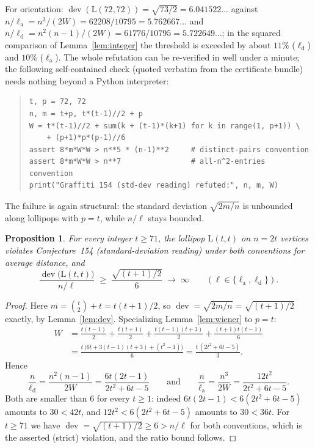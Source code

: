 \documentclass[11pt]{article}
\newtheorem{proposition}[theorem]{Proposition}
\theoremstyle{remark}
\newcommand{\dev}{\operatorname{dev}}
\newcommand{\la}{\ell_{\mathrm{a}}}
\newcommand{\ld}{\ell_{\mathrm{d}}}
\newcommand{\Lol}{\mathrm{L}}
\begin{document}
For orientation: $\dev(\Lol(72,72)) = \sqrt{73/2} = 6.041522\ldots$ against
$n/\la = n^3/(2W) = 62208/10795 = 5.762667\ldots$ and
$n/\ld = n^2(n-1)/(2W) = 61776/10795 = 5.722649\ldots$; in the squared
comparison of Lemma~\ref{lem:integer} the threshold is exceeded by about
$11\%$ ($\ld$) and $10\%$ ($\la$). The whole refutation can be re-verified
in well under a minute; the following self-contained check (quoted verbatim
from the certificate bundle) needs nothing beyond a Python interpreter:

\begin{quote}
\begin{verbatim}
t, p = 72, 72
n, m = t+p, t*(t-1)//2 + p
W = t*(t-1)//2 + sum(k + (t-1)*(k+1) for k in range(1, p+1)) \
    + (p+1)*p*(p-1)//6
assert 8*m*W*W > n**5 * (n-1)**2     # distinct-pairs convention
assert 8*m*W*W > n**7                # all-n^2-entries convention
print("Graffiti 154 (std-dev reading) refuted:", n, m, W)
\end{verbatim}
\end{quote}

The failure is again structural: the standard deviation $\sqrt{2m/n}$ is
unbounded along lollipops with $p = t$, while $n/\ell$ stays bounded.

\begin{proposition}\label{prop:154asymp}
For every integer $t \ge 71$, the lollipop $\Lol(t,t)$ on $n = 2t$ vertices
violates Conjecture~154 (standard-deviation reading) under both conventions
for average distance, and
\[
\frac{\dev\bigl(\Lol(t,t)\bigr)}{\,n/\ell\,} \;\ge\;
\frac{\sqrt{(t+1)/2}}{6} \;\longrightarrow\; \infty
\qquad (\ell \in \{\la, \ld\}).
\]
\end{proposition}

\begin{proof}
Here $m = \binom{t}{2} + t = t(t+1)/2$, so $\dev = \sqrt{2m/n} =
\sqrt{(t+1)/2}$ exactly, by Lemma~\ref{lem:dev}. Specializing
Lemma~\ref{lem:wiener} to $p = t$:
\begin{align*}
W &= \frac{t(t-1)}{2} + \frac{t(t+1)}{2} + \frac{t(t-1)(t+3)}{2}
+ \frac{(t+1)t(t-1)}{6}\\
&= \frac{t\,\bigl(6t + 3(t-1)(t+3) + (t^2-1)\bigr)}{6}
= \frac{t\,(2t^2 + 6t - 5)}{3}.
\end{align*}
Hence
\[
\frac{n}{\ld} = \frac{n^2(n-1)}{2W} = \frac{6t(2t-1)}{2t^2+6t-5}
\qquad\text{and}\qquad
\frac{n}{\la} = \frac{n^3}{2W} = \frac{12t^2}{2t^2+6t-5}.
\]
Both are smaller than $6$ for every $t \ge 1$: indeed
$6t(2t-1) < 6(2t^2+6t-5)$ amounts to $30 < 42t$, and
$12t^2 < 6(2t^2+6t-5)$ amounts to $30 < 36t$. For $t \ge 71$ we have
$\dev = \sqrt{(t+1)/2} \ge 6 > n/\ell$ for both conventions, which is the
asserted (strict) violation, and the ratio bound follows.
\end{proof}
\end{document}
